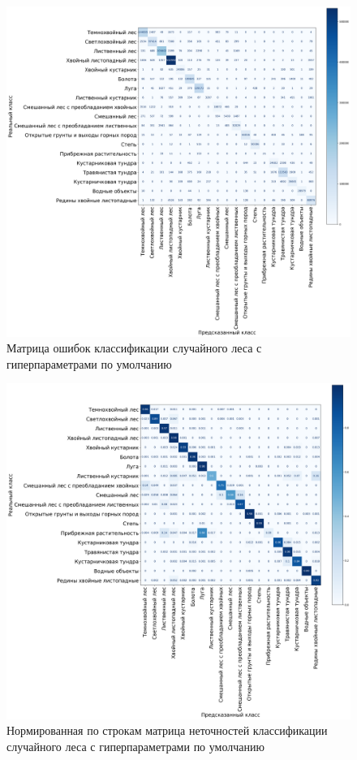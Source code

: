 \documentclass[14pt, a4paper, oneside]{extarticle}
\begin{document}
\begin{figure}[H]
    \caption{Матрица ошибок классификации случайного леса с гиперпараметрами по умолчанию}
    \centering
    \includegraphics[scale=0.33]{confusion-matrix-1}
\end{figure}

\begin{figure}[H]
    \caption{Нормированная по строкам матрица неточностей классификации случайного леса с гиперпараметрами по умолчанию}
    \centering
    \includegraphics[scale=0.33]{confusion-matrix-2}
\end{figure}
\end{document}
